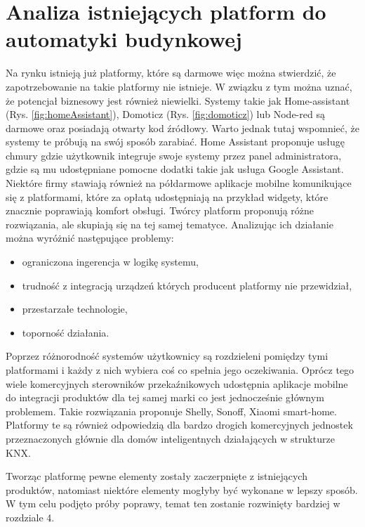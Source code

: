 \chapter{Analiza istniejących platform do automatyki budynkowej}
Na rynku istnieją już platformy, które są darmowe więc można stwierdzić, że zapotrzebowanie na takie platformy nie istnieje. W związku z tym można uznać, że potencjał biznesowy jest również niewielki. Systemy takie jak Home-assistant (Rys.  \ref{fig:homeAssistant}), Domoticz (Rys. \ref{fig:domoticz}) lub Node-red są darmowe oraz posiadają otwarty kod źródłowy. Warto jednak tutaj wspomnieć, że systemy te próbują na swój sposób zarabiać. Home Assistant proponuje usługę chmury gdzie użytkownik integruje swoje systemy przez panel administratora, gdzie są mu udostępniane pomocne dodatki takie jak usługa Google Assistant.
Niektóre firmy stawiają również na półdarmowe aplikacje mobilne komunikujące się z platformami, które za opłatą udostępniają na przykład widgety, które znacznie poprawiają komfort obsługi.
Twórcy platform proponują różne rozwiązania, ale skupiają się na tej samej tematyce. Analizując ich działanie można wyróżnić następujące problemy:
\begin{itemize}
    \item ograniczona ingerencja w logikę systemu,
    \item trudność z integracją urządzeń których producent platformy nie przewidział,
    \item przestarzałe technologie,
    \item toporność działania.
\end{itemize}
Poprzez różnorodność systemów użytkownicy są rozdzieleni pomiędzy tymi platformami i każdy z nich wybiera coś co spełnia jego oczekiwania.
Oprócz tego wiele komercyjnych sterowników przekaźnikowych udostępnia aplikacje mobilne do integracji produktów dla tej samej marki co jest jednocześnie głównym problemem. Takie rozwiązania proponuje Shelly, Sonoff, Xiaomi smart-home. Platformy te są również odpowiedzią dla bardzo drogich komercyjnych jednostek przeznaczonych  głównie dla domów inteligentnych działających w strukturze KNX. 
\par Tworząc platformę pewne elementy zostały zaczerpnięte z istniejących produktów, natomiast niektóre elementy mogłyby być wykonane w lepszy sposób. W tym celu podjęto próby poprawy, temat ten zostanie rozwinięty bardziej w rozdziale 4.


